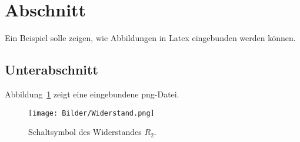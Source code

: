 \section{Abschnitt}
Ein Beispiel solle zeigen, wie Abbildungen in Latex eingebunden werden können.

\subsection{Unterabschnitt}
Abbildung~\ref{abb:Widerstand} zeigt eine eingebundene png-Datei.

\begin{figure}[h]
\centering
\texttt{[image: Bilder/Widerstand.png]}
\caption{Schaltsymbol des Widerstandes $R_2$.}
\label{abb:Widerstand}
\end{figure}
